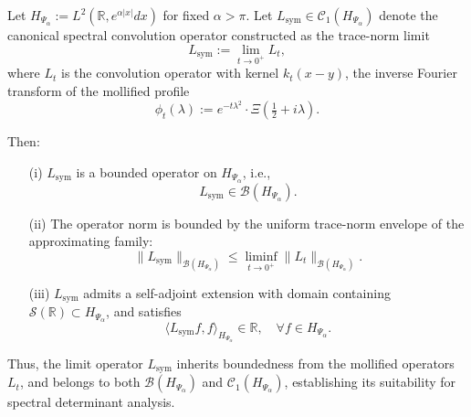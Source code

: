 \begin{lemma}
\label{lem:boundedness_Lsym}
Let \( H_{\Psi_\alpha} := L^2(\mathbb{R}, e^{\alpha|x|} dx) \) for fixed \( \alpha > \pi \). Let \( L_{\mathrm{sym}} \in \mathcal{C}_1(H_{\Psi_\alpha}) \) denote the canonical spectral convolution operator constructed as the trace-norm limit
\[
L_{\mathrm{sym}} := \lim_{t \to 0^+} L_t,
\]
where \( L_t \) is the convolution operator with kernel \( k_t(x - y) \), the inverse Fourier transform of the mollified profile
\[
\phi_t(\lambda) := e^{-t\lambda^2} \cdot \Xi\left( \tfrac{1}{2} + i\lambda \right).
\]

Then:
\begin{enumerate}
    \item[\textnormal{(i)}] \( L_{\mathrm{sym}} \) is a bounded operator on \( H_{\Psi_\alpha} \), i.e.,
    \[
    L_{\mathrm{sym}} \in \mathcal{B}(H_{\Psi_\alpha}).
    \]

    \item[\textnormal{(ii)}] The operator norm is bounded by the uniform trace-norm envelope of the approximating family:
    \[
    \| L_{\mathrm{sym}} \|_{\mathcal{B}(H_{\Psi_\alpha})} \le \liminf_{t \to 0^+} \| L_t \|_{\mathcal{B}(H_{\Psi_\alpha})}.
    \]

    \item[\textnormal{(iii)}] \( L_{\mathrm{sym}} \) admits a self-adjoint extension with domain containing \( \mathcal{S}(\mathbb{R}) \subset H_{\Psi_\alpha} \), and satisfies
    \[
    \langle L_{\mathrm{sym}} f, f \rangle_{H_{\Psi_\alpha}} \in \mathbb{R}, \quad \forall f \in H_{\Psi_\alpha}.
    \]
\end{enumerate}

\noindent
Thus, the limit operator \( L_{\mathrm{sym}} \) inherits boundedness from the mollified operators \( L_t \), and belongs to both \( \mathcal{B}(H_{\Psi_\alpha}) \) and \( \mathcal{C}_1(H_{\Psi_\alpha}) \), establishing its suitability for spectral determinant analysis.
\end{lemma}
% 